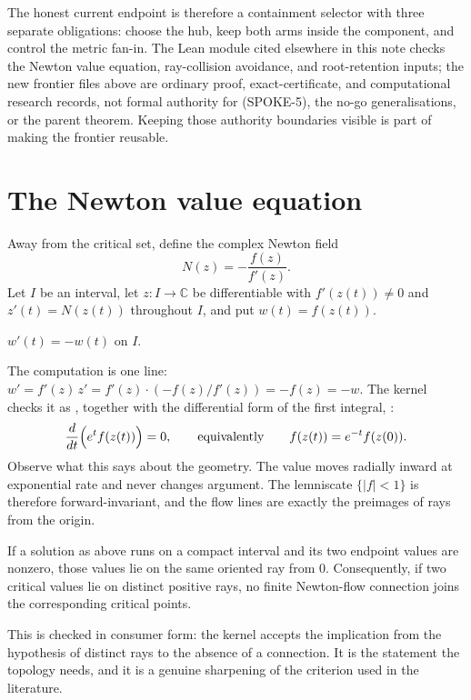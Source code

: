 \documentclass[11pt]{article}
\begin{document}
The honest current endpoint is therefore a containment selector with three
separate obligations: choose the hub, keep both arms inside the component,
and control the metric fan-in.  The Lean module cited elsewhere in this note
checks the Newton value equation, ray-collision avoidance, and root-retention
inputs; the new frontier files above are ordinary proof, exact-certificate,
and computational research records, not formal authority for (SPOKE-5), the
no-go generalisations, or the parent theorem.  Keeping those authority
boundaries visible is part of making the frontier reusable.

\section{The Newton value equation}\label{sec:newton}

Away from the critical set, define the complex Newton field
\[
  N(z)=-\frac{f(z)}{f'(z)} .
\]
Let $I$ be an interval, let $z\colon I\to\mathbb C$ be differentiable with
$f'(z(t))\ne0$ and $z'(t)=N(z(t))$ throughout $I$, and put $w(t)=f(z(t))$.

\begin{theorem}\label{res:value}
$w'(t)=-w(t)$ on $I$.
\end{theorem}

\noindent The computation is one line: $w'=f'(z)\,z'=f'(z)\cdot(-f(z)/f'(z))=-f(z)=-w$.
The kernel checks it as , together with the
differential form of the first integral,
:
\[
  \frac{d}{dt}\Bigl(e^{t}f(z(t))\Bigr)=0,
  \qquad\text{equivalently}\qquad
  f(z(t))=e^{-t}f(z(0)) .
\]
Observe what this says about the geometry.  The value moves radially inward at
exponential rate and never changes argument.  The lemniscate $\{|f|<1\}$ is
therefore forward-invariant, and the flow lines are exactly the preimages of
rays from the origin.

\begin{corollary}\label{res:ray}
If a solution as above runs on a compact interval and its two endpoint values
are nonzero, those values lie on the same oriented ray from $0$.
Consequently, if two critical values lie on distinct positive rays, no
finite Newton-flow connection joins the corresponding critical points.
\end{corollary}

\noindent This is checked in consumer form: the kernel accepts the implication
from the hypothesis of distinct rays to the absence of a connection.  It is the
statement the topology needs, and it is a genuine sharpening of the criterion
used in the literature.
\end{document}
